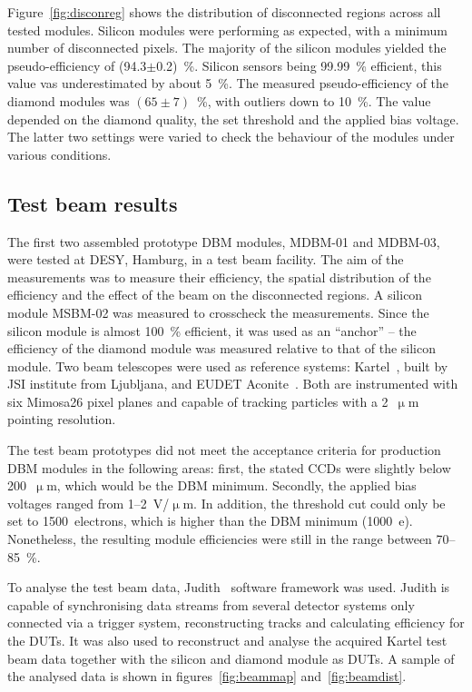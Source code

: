 \documentclass[twoside,12pt]{packages/mytustyle}  %
\begin{document}
Figure~\ref{fig:disconreg} shows the distribution of disconnected regions across all tested modules. Silicon modules were performing as expected, with a minimum number of disconnected pixels. The majority of the silicon modules yielded the pseudo-efficiency of (94.3$\pm$0.2)~\%. Silicon sensors being 99.99~\% efficient, this value vas underestimated by about 5~\%. The measured pseudo-efficiency of the diamond modules was $(65\pm7)$~\%, with outliers down to 10~\%. The value depended on the diamond quality, the set threshold and the applied bias voltage. The latter two settings were varied to check the behaviour of the modules under various conditions. 

\subsection{Test beam results}
The first two assembled prototype DBM modules, MDBM-01 and MDBM-03, were tested at DESY, Hamburg, in a test beam facility. The aim of the measurements was to measure their efficiency, the spatial distribution of the efficiency and the effect of the beam on the disconnected regions. A silicon module MSBM-02 was measured to crosscheck the measurements. Since the silicon module is almost 100~\% efficient, it was used as an ``anchor'' -- the efficiency of the diamond module was measured relative to that of the silicon module. Two beam telescopes were used as reference systems: Kartel~\cite{}, built by JSI institute from Ljubljana, and EUDET Aconite~\cite{}. Both are instrumented with six Mimosa26 pixel planes and capable of tracking particles with a 2~$\upmu$m pointing resolution.

The test beam prototypes did not meet the acceptance criteria for production DBM modules in the following areas: first, the stated CCDs were slightly below 200~$\upmu$m, which would be the DBM minimum. Secondly, the applied bias voltages ranged from 1--2~V/$\upmu$m. In addition, the threshold cut could only be set to 1500~electrons, which is higher than the DBM minimum (1000~e). Nonetheless, the resulting module efficiencies were still in the range between 70--85~\%.

To analyse the test beam data, Judith~\cite{} software framework was used. Judith is capable of synchronising data streams from several detector systems only connected via a trigger system, reconstructing tracks and calculating efficiency for the DUTs. It was also used to reconstruct and analyse the acquired Kartel test beam data together with the silicon and diamond module as DUTs. A sample of the analysed data is shown in figures~\ref{fig:beammap} and~\ref{fig:beamdist}. 
\end{document}
